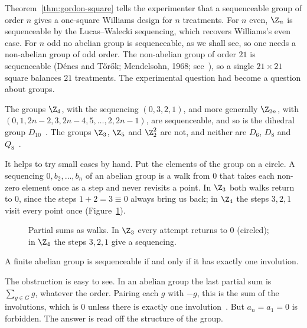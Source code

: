 Theorem~\ref{thm:gordon-square} tells the experimenter that a sequenceable group of order $n$ gives a one-square Williams design for $n$ treatments. For $n$ even, $\Z_n$ is sequenceable by the Lucas--Walecki sequencing, which recovers Williams's even case. For $n$ odd no abelian group is sequenceable, as we shall see, so one needs a non-abelian group of odd order. The non-abelian group of order $21$ is sequenceable (D\'enes and T\H{o}r\H{o}k; Mendelsohn, 1968; see~\cite{oll25}), so a single $21\times21$ square balances $21$ treatments. The experimental question had become a question about groups.


The groups $\Z_4$, with the sequencing $(0,3,2,1)$, and more generally $\Z_{2n}$, with $(0,1,2n-2,3,2n-4,5,\dots,2,2n-1)$, are sequenceable, and so is the dihedral group $D_{10}$~\cite{gor61}. The groups $\Z_3$, $\Z_5$ and $\Z_2^2$ are not, and neither are $D_6$, $D_8$ and $Q_8$~\cite{gor61}.

It helps to try small cases by hand. Put the elements of the group on a circle. A sequencing $0,b_2,\dots,b_n$ of an abelian group is a walk from $0$ that takes each non-zero element once as a step and never revisits a point. In $\Z_3$ both walks return to $0$, since the steps $1+2=3\equiv0$ always bring us back; in $\Z_4$ the steps $3,2,1$ visit every point once (Figure~\ref{fig:try-z3}).

\begin{figure}[ht]
\centering

\caption{Partial sums as walks. In $\Z_3$ every attempt returns to $0$ (circled); in $\Z_4$ the steps $3,2,1$ give a sequencing.}
\label{fig:try-z3}
\end{figure}


\begin{theorem}\label{thm:gordon-abelian}
A finite abelian group is sequenceable if and only if it has exactly one involution.
\end{theorem}

The obstruction is easy to see. In an abelian group the last partial sum is $\sum_{g\in G}g$, whatever the order. Pairing each $g$ with $-g$, this is the sum of the involutions, which is $0$ unless there is exactly one involution~\cite[Theorem~3]{oll25}. But $a_n=a_1=0$ is forbidden. The answer is read off the structure of the group.


